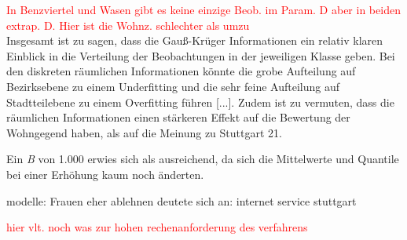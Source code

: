 \documentclass{Vorlage}
\begin{document}
\textcolor{red}{In Benzviertel und Wasen gibt es keine einzige Beob. im Param. D aber in beiden extrap. D. Hier ist die Wohnz. schlechter als umzu}\\
Insgesamt ist zu sagen, dass die Gauß-Krüger Informationen ein relativ klaren Einblick in die Verteilung der Beobachtungen in der jeweiligen Klasse geben. Bei den diskreten räumlichen Informationen könnte die grobe Aufteilung auf Bezirksebene zu einem Underfitting und die sehr feine Aufteilung auf Stadtteilebene zu einem Overfitting führen [...]. Zudem ist zu vermuten, dass die räumlichen Informationen einen stärkeren Effekt auf die Bewertung der Wohngegend haben, als auf die Meinung zu Stuttgart 21.

Ein \textit{B} von 1.000 erwies sich als ausreichend, da sich die Mittelwerte und Quantile bei einer Erhöhung kaum noch änderten.

modelle: Frauen eher ablehnen deutete sich an: internet service stuttgart

\textcolor{red}{hier vlt. noch was zur hohen rechenanforderung des verfahrens}

\newpage
\end{document}
